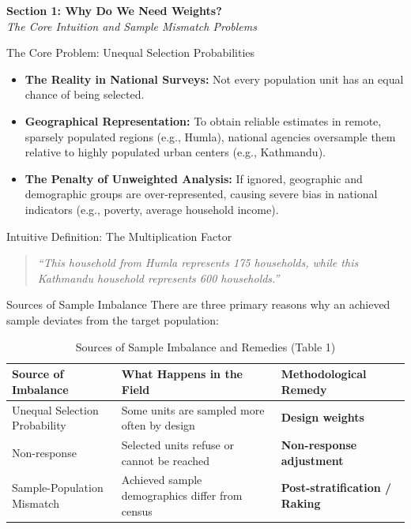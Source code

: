 \documentclass[10pt, aspectratio=169]{beamer}
\begin{document}
{
\begin{frame}[plain, c]
  \centering
  \color{white}
  \Huge \textbf{Section 1: Why Do We Need Weights?} \\
  \vspace{0.4cm}
  \Large \textit{The Core Intuition and Sample Mismatch Problems}
\end{frame}
}

\begin{frame}{The Core Problem: Unequal Selection Probabilities}
  \begin{itemize}
    \item \textbf{The Reality in National Surveys:} Not every population unit has an equal chance of being selected.
    \item \textbf{Geographical Representation:} To obtain reliable estimates in remote, sparsely populated regions (e.g., Humla), national agencies oversample them relative to highly populated urban centers (e.g., Kathmandu).
    \item \textbf{The Penalty of Unweighted Analysis:} If ignored, geographic and demographic groups are over-represented, causing severe bias in national indicators (e.g., poverty, average household income).
  \end{itemize}
  \begin{block}{Intuitive Definition: The Multiplication Factor}
    \begin{quote}
      \textit{``This household from Humla represents 175 households, while this Kathmandu household represents 600 households.''}
    \end{quote}
  \end{block}
\end{frame}

\begin{frame}{Sources of Sample Imbalance}
  There are three primary reasons why an achieved sample deviates from the target population:
  
  \begin{table}
    \centering
    \footnotesize
    \begin{tabular}{lll}
      \toprule
      \textbf{Source of Imbalance} & \textbf{What Happens in the Field} & \textbf{Methodological Remedy} \\
      \midrule
      Unequal Selection Probability & Some units are sampled more often by design & \textbf{Design weights} \\
      Non-response & Selected units refuse or cannot be reached & \textbf{Non-response adjustment} \\
      Sample-Population Mismatch & Achieved sample demographics differ from census & \textbf{Post-stratification / Raking} \\
      \bottomrule
    \end{tabular}
    \caption{Sources of Sample Imbalance and Remedies (Table 1)}
  \end{table}
\end{frame}
\end{document}
